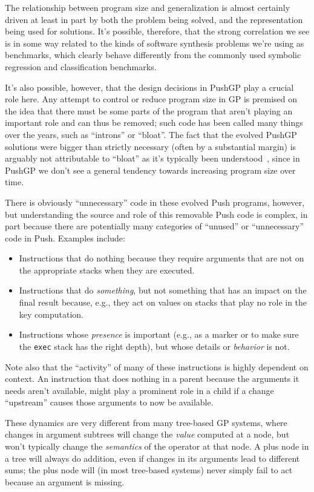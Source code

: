 The relationship between
program size and generalization is almost certainly driven at least in part
by both the problem being solved, and the representation being used for
solutions. It's possible, therefore, that the strong correlation we see
is in some way related to the kinds of software synthesis problems we're using
as benchmarks, which clearly behave differently from the commonly used
symbolic regression and classification benchmarks. 

It's also possible,
however, that the design decisions in PushGP play a crucial role here. Any
attempt to control or reduce program size in GP is premised on the idea that
there must be some parts of the program that aren't playing an important role
and can thus be removed; such code has been called many things over the years,
such as ``introns'' or ``bloat''. The fact that the evolved PushGP solutions
were bigger than strictly necessary (often by a substantial margin) is arguably
not attributable to ``bloat'' as it's typically been 
understood~\cite{poli08:fieldguide}, since in PushGP we don't see a 
general tendency towards increasing program size over time. 

There is obviously ``unnecessary'' code in these evolved Push programs, 
however, but understanding the source and role of this removable Push 
code is complex, in part because there are potentially many categories 
of ``unused'' or ``unnecessary'' code
in Push. Examples include:
\begin{itemize}
	\item Instructions that do nothing because they require arguments 
	that are not on the appropriate stacks when they are executed. 
	\item Instructions that do \emph{something}, but not something that has an 
	impact on the final result because, e.g., they act on values on stacks 
	that play no role in the key computation. 
	\item Instructions whose \emph{presence} is important (e.g., as a marker 
	or to make sure the \texttt{exec} stack has the right depth), but 
	whose details or \emph{behavior} is not.
\end{itemize}
Note also that the ``activity'' of many of these instructions is highly
dependent on context. An instruction that does nothing in a parent because
the arguments it needs aren't available, might play a prominent role in a
child if a change ``upstream'' causes those arguments to now be available.

These dynamics are very different from many tree-based GP systems, where
changes in argument subtrees will change the \emph{value} computed at a 
node, but won't typically change the \emph{semantics} of the operator at that
node. A plus node in a tree will always do addition, even if changes in its
arguments lead to different sums; the plus node will (in most tree-based
systems) never simply fail to act because an argument is missing.

